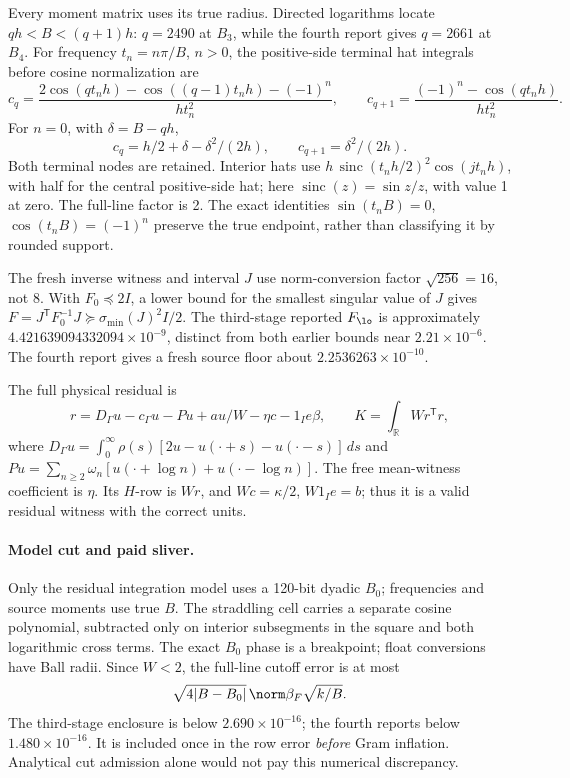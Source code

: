 \documentclass[11pt,a4paper]{article}
\numberwithin{equation}{section}
\theoremstyle{definition}\newtheorem{definition}[theorem]{Definition}
\theoremstyle{remark}\newtheorem{remark}[theorem]{Remark}
\newcommand{\R}{\mathbb R}\newcommand{\C}{\mathbb C}\newcommand{\N}{\mathbb N}
\begin{document}
Every moment matrix uses its true radius. Directed logarithms locate
\(qh<B<(q+1)h\): \(q=2490\) at \(B_3\), while the fourth report gives
\(q=2661\) at \(B_4\).
For frequency \(t_n=n\pi/B\), \(n>0\), the positive-side terminal
hat integrals before cosine normalization are
\[
c_q=\frac{2\cos(qt_nh)-\cos((q-1)t_nh)-(-1)^n}{ht_n^2},
\qquad
c_{q+1}=\frac{(-1)^n-\cos(qt_nh)}{ht_n^2}.
\]
For \(n=0\), with \(\delta=B-qh\),
\[
c_q=h/2+\delta-\delta^2/(2h),\qquad c_{q+1}=\delta^2/(2h).
\]
Both terminal nodes are retained. Interior hats use
\(h\,\operatorname{sinc}(t_nh/2)^2\cos(jt_nh)\), with half for the
central positive-side hat; here \(\operatorname{sinc}(z)=\sin z/z\),
with value 1 at zero. The full-line factor is 2.
The exact identities \(\sin(t_nB)=0\), \(\cos(t_nB)=(-1)^n\) preserve
the true endpoint, rather than classifying it by rounded support.

The fresh inverse witness and interval \(J\) use norm-conversion factor
\(\sqrt{256}=16\), not 8. With \(F_0\preceq2I\), a lower bound for the
smallest singular value of \(J\) gives
\(F=J^{\mathsf T}F_0^{-1}J\succeq\sigma_{\min}(J)^2I/2\).
The third-stage reported \(F_{\lo}\) is approximately \(4.421639094332094\times10^{-9}\),
distinct from both earlier bounds near \(2.21\times10^{-6}\).
The fourth report gives a fresh source floor about \(2.2536263\times10^{-10}\).

The full physical residual is
\[
r=D_\Gamma u-c_\Gamma u-Pu+au/W-\eta c-1_Ie\beta,\qquad
K=\int_\R Wr^{\mathsf T}r,
\]
where \(D_\Gamma u=\int_0^\infty\rho(s)[2u-u(\cdot+s)-u(\cdot-s)]\,ds\)
and \(Pu=\sum_{n\geq2}\omega_n[u(\cdot+\log n)+u(\cdot-\log n)]\).
The free mean-witness coefficient is \(\eta\). Its \(H\)-row is \(Wr\), and \(Wc=\kappa/2\), \(W1_Ie=b\);
thus it is a valid residual witness with the correct units.

\paragraph{Model cut and paid sliver.}
Only the residual integration model uses a 120-bit dyadic \(B_0\);
frequencies and source moments use true \(B\).
The straddling cell carries a separate cosine polynomial, subtracted only
on interior subsegments in the square and both logarithmic cross terms.
The exact \(B_0\) phase is a breakpoint; float conversions have Ball radii.
Since \(W<2\), the full-line cutoff error is at most
\[
\sqrt{4|B-B_0|}\,\norm\beta_F\sqrt{k/B}.
\]
The third-stage enclosure is below \(2.690\times10^{-16}\); the fourth
reports below \(1.480\times10^{-16}\).
It is included once in the row error \emph{before} Gram inflation.
Analytical cut admission alone would not pay this numerical discrepancy.
\end{document}
